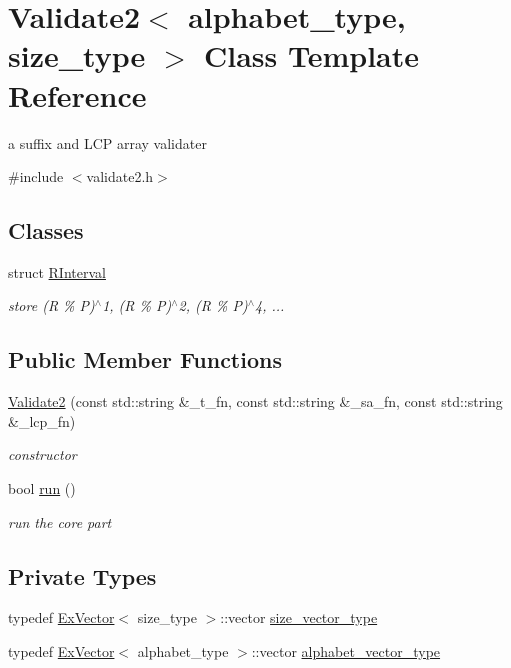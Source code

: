 \hypertarget{class_validate2}{}\section{Validate2$<$ alphabet\+\_\+type, size\+\_\+type $>$ Class Template Reference}
\label{class_validate2}


a suffix and L\+CP array validater  




{\ttfamily \#include $<$validate2.\+h$>$}

\subsection*{Classes}
\begin{DoxyCompactItemize}
\item 
struct \hyperlink{struct_validate2_1_1_r_interval}{R\+Interval}
\begin{DoxyCompactList}\small\item\em store (R \% P)$^\wedge$1, (R \% P)$^\wedge$2, (R \% P)$^\wedge$4, ... \end{DoxyCompactList}\end{DoxyCompactItemize}
\subsection*{Public Member Functions}
\begin{DoxyCompactItemize}
\item 
\hyperlink{class_validate2_a003e523f9fb81a2d6a465d6cec444c1f}{Validate2} (const std\+::string \&\+\_\+t\+\_\+fn, const std\+::string \&\+\_\+sa\+\_\+fn, const std\+::string \&\+\_\+lcp\+\_\+fn)
\begin{DoxyCompactList}\small\item\em constructor \end{DoxyCompactList}\item 
bool \hyperlink{class_validate2_aa93abe8bbd0bbdaebd1b5a1c5a4c66df}{run} ()
\begin{DoxyCompactList}\small\item\em run the core part \end{DoxyCompactList}\end{DoxyCompactItemize}
\subsection*{Private Types}
\begin{DoxyCompactItemize}
\item 
typedef \hyperlink{struct_ex_vector}{Ex\+Vector}$<$ size\+\_\+type $>$\+::vector \hyperlink{class_validate2_a8dab9b86f9c73419431821ebb68852c5}{size\+\_\+vector\+\_\+type}
\item 
typedef \hyperlink{struct_ex_vector}{Ex\+Vector}$<$ alphabet\+\_\+type $>$\+::vector \hyperlink{class_validate2_a351a2e7bbfdf9b87ecbb4f08cdbc1e64}{alphabet\+\_\+vector\+\_\+type}
\end{DoxyCompactItemize}
